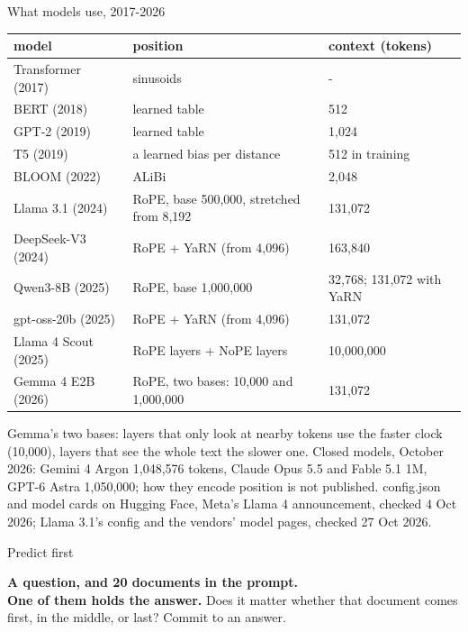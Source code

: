 \documentclass[aspectratio=169]{beamer}
\newcommand{\src}[1]{{\scriptsize\color{gray} #1}}
\begin{document}
\begin{frame}{What models use, 2017-2026}
  \footnotesize
  \begin{center}
  \begin{tabular}{lll}
    \textbf{model} & \textbf{position} & \textbf{context (tokens)} \\
    \hline
    Transformer (2017) & sinusoids & - \\
    BERT (2018) & learned table & 512 \\
    GPT-2 (2019) & learned table & 1,024 \\
    T5 (2019) & a learned bias per distance & 512 in training \\
    BLOOM (2022) & ALiBi & 2,048 \\
    Llama 3.1 (2024) & RoPE, base 500,000, stretched from 8,192 & 131,072 \\
    DeepSeek-V3 (2024) & RoPE + YaRN (from 4,096) & 163,840 \\
    Qwen3-8B (2025) & RoPE, base 1,000,000 & 32,768; 131,072 with YaRN \\
    gpt-oss-20b (2025) & RoPE + YaRN (from 4,096) & 131,072 \\
    Llama 4 Scout (2025) & RoPE layers + NoPE layers & 10,000,000 \\
    Gemma 4 E2B (2026) & RoPE, two bases: 10,000 and 1,000,000 & 131,072 \\
  \end{tabular}
  \end{center}
  \vskip 4pt
  {\small Gemma's two bases: layers that only look at nearby tokens use the faster clock
  (10,000), layers that see the whole text the slower one. Closed models, October 2026: Gemini 4
  Argon 1,048,576 tokens, Claude Opus 5.5 and Fable 5.1 1M, GPT-6 Astra 1,050,000; how they encode
  position is not published.}
  \vskip 2pt
  \src{config.json and model cards on Hugging Face, Meta's Llama 4 announcement, checked 4 Oct
  2026; Llama 3.1's config and the vendors' model pages, checked 27 Oct 2026.}
\end{frame}

\begin{frame}{Predict first}
  \vskip 26pt
  \begin{center}
    {\Large\color{popblue}\textbf{A question, and 20 documents in the prompt.\\[4pt] One of them
    holds the answer.}}
    \vskip 14pt
    {\small Does it matter whether that document comes first, in the middle, or last?}
    \vskip 24pt
    {\small\color{gray}Commit to an answer.}
  \end{center}
\end{frame}
\end{document}
